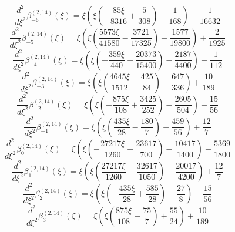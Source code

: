 
\begin{equation}
\frac{d^{2}}{d\xi^{2}}\beta_{-6}^{(2,14)} (\xi) =
 \xi \left(\xi \left(- \frac{85 \xi}{8316} + \frac{5}{308}\right) - \frac{1}{168}\right) - \frac{1}{16632}
\end{equation}
\begin{equation}
\frac{d^{2}}{d\xi^{2}}\beta_{-5}^{(2,14)} (\xi) =
 \xi \left(\xi \left(\frac{5573 \xi}{41580} - \frac{3721}{17325}\right) + \frac{1577}{19800}\right) + \frac{2}{1925}
\end{equation}
\begin{equation}
\frac{d^{2}}{d\xi^{2}}\beta_{-4}^{(2,14)} (\xi) =
 \xi \left(\xi \left(- \frac{359 \xi}{440} + \frac{20373}{15400}\right) - \frac{2187}{4400}\right) - \frac{1}{112}
\end{equation}
\begin{equation}
\frac{d^{2}}{d\xi^{2}}\beta_{-3}^{(2,14)} (\xi) =
 \xi \left(\xi \left(\frac{4645 \xi}{1512} - \frac{425}{84}\right) + \frac{647}{336}\right) + \frac{10}{189}
\end{equation}
\begin{equation}
\frac{d^{2}}{d\xi^{2}}\beta_{-2}^{(2,14)} (\xi) =
 \xi \left(\xi \left(- \frac{875 \xi}{108} + \frac{3425}{252}\right) - \frac{2605}{504}\right) - \frac{15}{56}
\end{equation}
\begin{equation}
\frac{d^{2}}{d\xi^{2}}\beta_{-1}^{(2,14)} (\xi) =
 \xi \left(\xi \left(\frac{435 \xi}{28} - \frac{180}{7}\right) + \frac{459}{56}\right) + \frac{12}{7}
\end{equation}
\begin{equation}
\frac{d^{2}}{d\xi^{2}}\beta_{0}^{(2,14)} (\xi) =
 \xi \left(\xi \left(- \frac{27217 \xi}{1260}
 + \frac{23617}{700}\right) - \frac{10417}{1400}\right) - \frac{5369}{1800}
\end{equation}
\begin{equation}
\frac{d^{2}}{d\xi^{2}}\beta_{1}^{(2,14)} (\xi) =
 \xi \left(\xi \left(\frac{27217 \xi}{1260} - \frac{32617}{1050}\right) + \frac{20017}{4200}\right) + \frac{12}{7}
\end{equation}
\begin{equation}
\frac{d^{2}}{d\xi^{2}}\beta_{2}^{(2,14)} (\xi) =
 \xi \left(\xi \left(- \frac{435 \xi}{28} + \frac{585}{28}\right) - \frac{27}{8}\right) - \frac{15}{56}
\end{equation}
\begin{equation}
\frac{d^{2}}{d\xi^{2}}\beta_{3}^{(2,14)} (\xi) =
 \xi \left(\xi \left(\frac{875 \xi}{108} - \frac{75}{7}\right) + \frac{55}{24}\right) + \frac{10}{189}
\end{equation}
